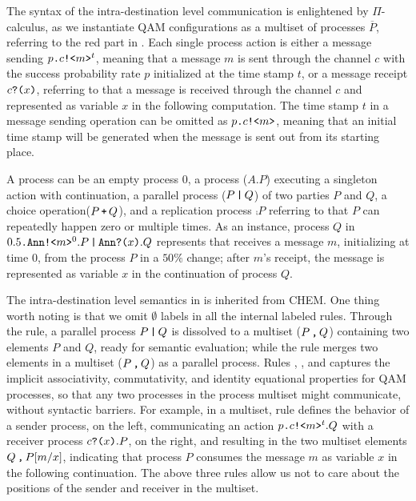 The syntax of the intra-destination level communication is enlightened by $\Pi$-calculus, as we instantiate QAM configurations as a multiset of processes $\overline{P}$, referring to the red part in .
Each single process action is either a message sending $p\texttt{.}c\texttt{!<}m\texttt{>}^{t}$, meaning that a message $m$ is sent through the channel $c$ with the success probability rate $p$ initialized at the time stamp $t$, or a message receipt $c\texttt{?(}x\texttt{)}$, referring to that a message is received through the channel $c$ and represented as variable $x$ in the following computation.
The time stamp $t$ in a message sending operation can be omitted as $p\texttt{.}c\texttt{!<}m\texttt{>}$, meaning that an initial time stamp will be generated when the message is sent out from its starting place.

A process can be an empty process $0$, a process ($A.P$) executing a singleton action with continuation, a parallel process ($P\,\texttt{|}\,Q$) of two parties $P$ and $Q$, a choice operation($P\,\texttt{+}\,Q$), and a replication process $\comp{P}$ referring to that $P$ can repeatedly happen zero or multiple times. As an instance, process $Q$ in $0.5\texttt{.}\texttt{Ann}\texttt{!<}m\texttt{>}^0.P\,\texttt{|}\,\texttt{Ann}\texttt{?(}x\texttt{)}.Q$ represents that  receives a message $m$, initializing at time $0$, from the process $P$ in a $50\%$ change; after $m$'s receipt, the message is represented as variable $x$ in the continuation of process $Q$.

The intra-destination level semantics in  is inherited from CHEM.
One thing worth noting is that we omit $\emptyset$ labels in all the internal labeled rules.
Through the  rule, a parallel process $P\,\texttt{|}\,Q$ is dissolved to a multiset ($P\,\texttt{,}\,Q$) containing two elements $P$ and $Q$, ready for semantic evaluation; while the  rule merges two elements in a multiset ($P\,\texttt{,}\,Q$) as a parallel process. Rules , , and  captures the implicit associativity, commutativity, and identity equational properties for QAM processes, so that any two processes in the process multiset might communicate, without syntactic barriers. For example, in a multiset, rule  defines the behavior of a sender process, on the left, communicating an action $p\texttt{.}c\texttt{!<}m\texttt{>}^t.Q$ with a receiver process $c\texttt{?(}x\texttt{)}.P$, on the right, and resulting in the two multiset elements $Q\,\texttt{,}\,P[m/x]$, indicating that process $P$ consumes the message $m$ as variable $x$ in the following continuation. The above three rules allow us not to care about the positions of the sender and receiver in the multiset.


